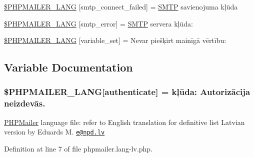 \begin{DoxyCompactItemize}
\item 
\hyperlink{phpmailer_8lang-lv_8php_a7b321d4ca1e9df702403ed4c61aa0980}{\$\+P\+H\+P\+M\+A\+I\+L\+E\+R\+\_\+\+L\+A\+NG} \mbox{[}\textquotesingle{}smtp\+\_\+connect\+\_\+failed\textquotesingle{}\mbox{]} = \textquotesingle{}\hyperlink{class_s_m_t_p}{S\+M\+TP} savienojuma kļūda\textquotesingle{}
\item 
\hyperlink{phpmailer_8lang-lv_8php_a7d9cffba1e669c845f8a4c891ee50064}{\$\+P\+H\+P\+M\+A\+I\+L\+E\+R\+\_\+\+L\+A\+NG} \mbox{[}\textquotesingle{}smtp\+\_\+error\textquotesingle{}\mbox{]} = \textquotesingle{}\hyperlink{class_s_m_t_p}{S\+M\+TP} servera kļūda\+: \textquotesingle{}
\item 
\hyperlink{phpmailer_8lang-lv_8php_af795debc7a739d038742691c358d9032}{\$\+P\+H\+P\+M\+A\+I\+L\+E\+R\+\_\+\+L\+A\+NG} \mbox{[}\textquotesingle{}variable\+\_\+set\textquotesingle{}\mbox{]} = \textquotesingle{}Nevar piešķirt mainīgā vērtību\+: \textquotesingle{}
\end{DoxyCompactItemize}


\subsection{Variable Documentation}
\subsubsection[{\texorpdfstring{\$\+P\+H\+P\+M\+A\+I\+L\+E\+R\+\_\+\+L\+A\+NG}{$PHPMAILER_LANG}}]{\setlength{\rightskip}{0pt plus 5cm}\$P\+H\+P\+M\+A\+I\+L\+E\+R\+\_\+\+L\+A\+NG\mbox{[}\textquotesingle{}authenticate\textquotesingle{}\mbox{]} =  kļūda\+: Autorizācija neizdevās.\textquotesingle{}}\hypertarget{phpmailer_8lang-lv_8php_a2cb33073c989b85580748e331ed8b4aa}{}\label{phpmailer_8lang-lv_8php_a2cb33073c989b85580748e331ed8b4aa}
\hyperlink{class_p_h_p_mailer}{P\+H\+P\+Mailer} language file\+: refer to English translation for definitive list Latvian version by Eduards M. \href{mailto:e@npd.lv}{\tt e@npd.\+lv} 

Definition at line 7 of file phpmailer.\+lang-\/lv.\+php.

